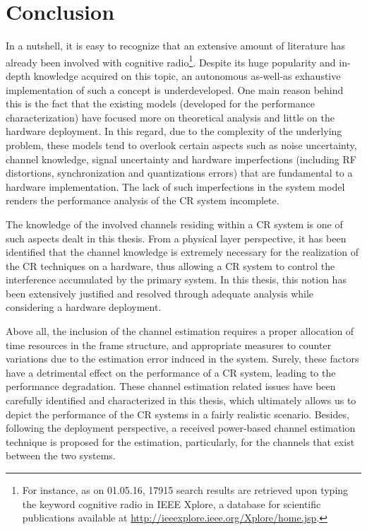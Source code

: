 \chapter{Conclusion}
\label{chap:Con}

In a nutshell, it is easy to recognize that an extensive amount of literature has already been involved with cognitive radio\footnote{For instance, as on 01.05.16, 17915 search results are retrieved upon typing the keyword cognitive radio in IEEE Xplore, a database for scientific publications available at \url{http://ieeexplore.ieee.org/Xplore/home.jsp}.}. Despite its huge popularity and in-depth knowledge acquired on this topic, an autonomous as-well-as exhaustive implementation of such a concept is underdeveloped. One main reason behind this is the fact that the existing models (developed for the performance characterization) have focused more on theoretical analysis and little on the hardware deployment. In this regard, due to the complexity of the underlying problem, these models tend to overlook certain aspects such as noise uncertainty, channel knowledge, signal uncertainty and hardware imperfections (including RF distortions, synchronization and quantizations errors) \cite{Sharma15} that are fundamental to a hardware implementation. The lack of such imperfections in the system model renders the performance analysis of the CR system incomplete. 

The knowledge of the involved channels residing within a CR system is one of such aspects dealt in this thesis. 
From a physical layer perspective, it has been identified that the channel knowledge is extremely necessary for the realization of the CR techniques on a hardware, thus allowing a CR system to control the interference accumulated by the primary system. In this thesis, this notion has been extensively justified and resolved through adequate analysis while considering a hardware deployment. %

Above all, the inclusion of the channel estimation requires a proper allocation of time resources in the frame structure, and appropriate measures to counter variations due to the estimation error induced in the system. Surely, these factors have a detrimental effect on the performance of a CR system, leading to the performance degradation. These channel estimation related issues have been carefully identified and characterized in this thesis, which ultimately allows us to depict the performance of the CR systems in a fairly realistic scenario. Besides, following the deployment perspective, a received power-based channel estimation technique is proposed for the estimation, particularly, for the channels that exist between the two systems. 

